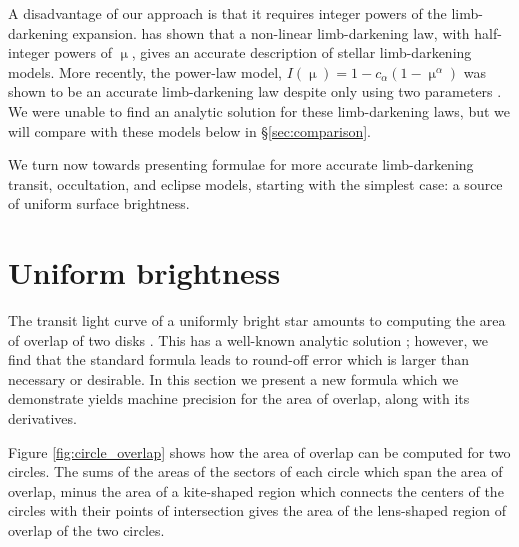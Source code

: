 \documentclass[modern]{aastex61}
\begin{document}
A disadvantage of our approach is that it requires integer powers of the limb-darkening
expansion.  \citet{Claret2000} has shown that a non-linear limb-darkening law,
with half-integer powers of $\upmu$, gives an accurate description of stellar
limb-darkening models.  More recently, the power-law model, $I(\upmu) = 1-
c_\alpha(1-\upmu^\alpha)$ \citep{Hestroffer1997} was shown to be an accurate
limb-darkening law despite only using two parameters \citep{Maxted2018,
Morello2017}.  We were unable to find an analytic solution for these limb-darkening
laws, but we will compare with these models below in \S \ref{sec:comparison}.

We turn now towards presenting formulae for more accurate limb-darkening transit,
occultation, and eclipse models, starting with the simplest case:  a source
of uniform surface brightness.


%

\section{Uniform brightness}

\label{sec:uniform}

The transit light curve of a uniformly bright star amounts to computing the
area of overlap of two disks \citep{MandelAgol2002}.  This has a well-known
analytic solution \citep[e.g.][]{Weisstein2018};  however, we find that the
standard formula leads to round-off error which is larger than necessary
or desirable.  In this section we present a new formula which we demonstrate 
yields machine precision for the area of overlap, along with its derivatives.

Figure \ref{fig:circle_overlap} shows how the area of overlap can be computed
for two circles.  The sums of the areas of the sectors of each circle which span
the area of overlap, minus the area of a kite-shaped region which connects the
centers of the circles with their points of intersection gives the area of the
lens-shaped region of overlap of the two circles.
\end{document}
